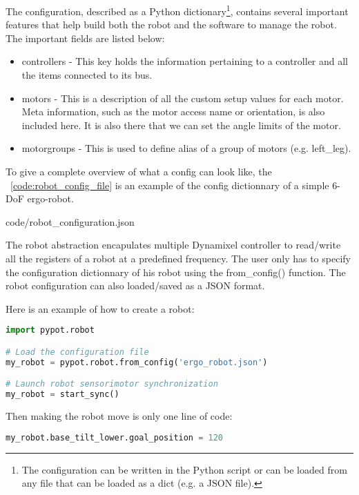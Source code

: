 The configuration, described as a Python dictionary\footnote{The configuration can be written in the Python script or can be loaded from any file that can be loaded as a dict (e.g. a JSON file).}, contains several important features that help build both the robot and the software to manage the robot. The important fields are listed below:

\begin{itemize}
    \item controllers - This key holds the information pertaining to a controller and all the items connected to its bus.
    \item motors - This is a description of all the custom setup values for each motor. Meta information, such as the motor access name or orientation, is also included here. It is also there that we can set the angle limits of the motor.
    \item motorgroups - This is used to define alias of a group of motors (e.g. left\_leg).
\end{itemize}

To give a complete overview of what a config can look like, the \codename~\ref{code:robot_config_file} is an example of the config dictionnary of a simple 6-DoF ergo-robot.


    {code/robot_configuration.json}


The robot abstraction encapulates multiple Dynamixel controller to read/write all the registers of a robot at a predefined frequency. The user only has to specify the configuration dictionnary of his robot using the from\_config() function. The robot configuration can also loaded/saved as a JSON format.

Here is an example of how to create a robot:
\begin{lstlisting}[language = Python]
import pypot.robot

# Load the configuration file
my_robot = pypot.robot.from_config('ergo_robot.json')

# Launch robot sensorimotor synchronization
my_robot = start_sync()
\end{lstlisting}


Then making the robot move is only one line of code:
\begin{lstlisting}[language = Python]
my_robot.base_tilt_lower.goal_position = 120
\end{lstlisting}

